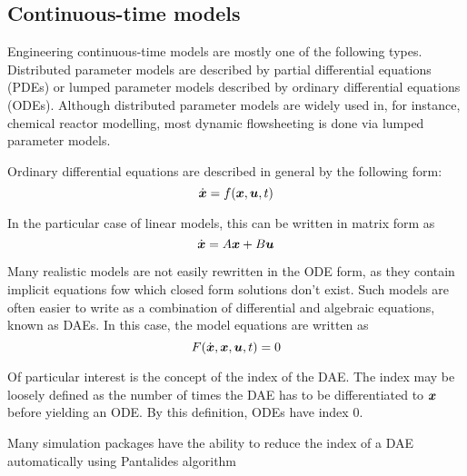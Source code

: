 \subsection{Continuous-time models}
Engineering continuous-time models are mostly one of the following types.
Distributed parameter models are described by partial differential equations (PDEs) or lumped parameter models described by ordinary differential equations (ODEs).
Although distributed parameter models are widely used in, for instance, chemical reactor modelling, most dynamic flowsheeting is done via lumped parameter models.

Ordinary differential equations are described in general by the following form:
\begin{equation}
  \label{eq:odeform}
  \dot{\boldsymbol{x}} = f(\boldsymbol{x}, \boldsymbol{u}, t)
\end{equation}

In the particular case of linear models, this can be written in matrix form as
\begin{equation}
  \label{eq:ode_linear}
  \dot{\boldsymbol{x}} = A\boldsymbol{x} + B\boldsymbol{u}
\end{equation}

Many realistic models are not easily rewritten in the ODE form, as they contain implicit equations fow which closed form solutions don't exist.
Such models are often easier to write as a combination of differential and algebraic equations, known as DAEs.
In this case, the model equations are written as
\begin{equation}
  \label{eq:daeform}
  F(\dot{\boldsymbol{x}}, \boldsymbol{x}, \boldsymbol{u}, t) = 0
\end{equation}

Of particular interest is the concept of the index of the DAE.
The index may be loosely defined as the number of times the DAE has to be differentiated to $\boldsymbol{x}$ before yielding an ODE.
By this definition, ODEs have index 0.

Many simulation packages have the ability to reduce the index of a DAE automatically using Pantalides algorithm 

